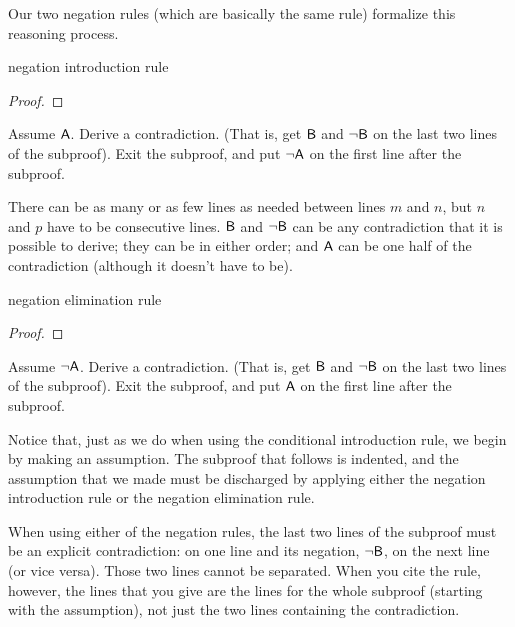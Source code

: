 Our two negation rules (which are basically the same rule) formalize this reasoning process.

\medskip


\begin{factboxy}{negation introduction rule}
\begin{proof}
\open
	\as{}
\close
{}
\end{proof}

\small{Assume $\mathsf{A}$. Derive a contradiction. (That is, get $\mathsf{B}$ and ${\neg}\mathsf{B}$ on the last two lines of the subproof). Exit the subproof, and put ${\neg}\mathsf{A}$ on the first line after the subproof.
\smallskip

There can be as many or as few lines as needed between lines $m$ and $n$, but $n$ and $p$ have to be consecutive lines. $\mathsf{B}$ and ${\neg}\mathsf{B}$ can be any contradiction that it is possible to derive; they can be in either order; and $\mathsf{A}$ can be one half of the contradiction (although it doesn't have to be).}

\end{factboxy}

\begin{factboxy}{negation elimination rule}
\begin{proof}
\open
	\as{}
\close
{}
\end{proof}

\small{Assume ${\neg}\mathsf{A}$. Derive a contradiction. (That is, get $\mathsf{B}$ and ${\neg}\mathsf{B}$ on the last two lines of the subproof). Exit the subproof, and put $\mathsf{A}$ on the first line after the subproof.}

\end{factboxy}

\medskip

\noindent Notice that, just as we do when using the conditional introduction rule, we begin by making an assumption. The subproof that follows is indented, and the assumption that we made must be discharged by applying either the negation introduction rule or the negation elimination rule. 

When using either of the negation rules, the last two lines of the subproof must be an explicit contradiction:  on one line and its negation, ${\neg}\mathsf{B}$, on the next line (or vice versa). Those two lines cannot be separated. When you cite the rule, however, the lines that you give are the lines for the whole subproof (starting with the assumption), not just the two lines containing the contradiction. 

